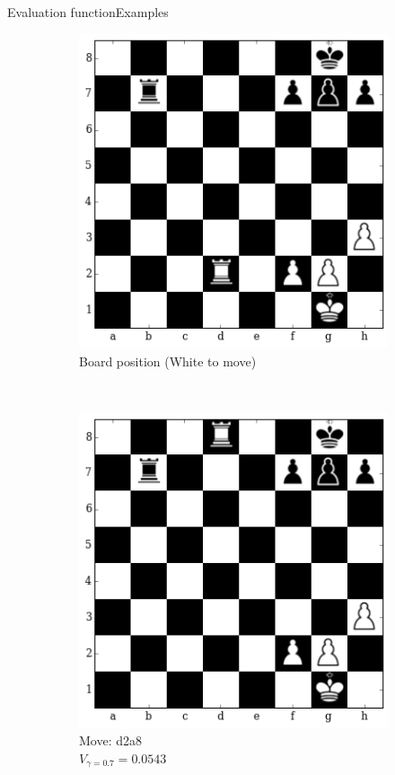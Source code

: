 \documentclass[9pt, unknownkeysallowed]{beamer}
\begin{document}
\begin{frame}{Evaluation function}{Examples}
{\begin{figure}[H]
\begin{subfigure}[t]{0.3\textwidth}
\includegraphics[width=\textwidth]{../img/table_evaluations/output_12_0.png}
        \caption{Board position (White to move)}
    \end{subfigure}
    ~
    \begin{subfigure}[t]{0.3\textwidth}
        \centering
        
    \includegraphics[width=\textwidth]{../img/table_evaluations/output_12_2.png}
        \caption{Move: d2a8\\
        $V_{\gamma=0.7}=0.0543$}
    \end{subfigure}
    ~
    \begin{subfigure}[t]{0.3\textwidth}
        \centering
        

\end{subfigure}
\end{figure}}
\end{frame}
\end{document}

